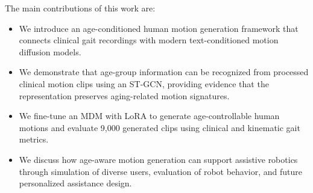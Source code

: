 The main contributions of this work are:
\begin{itemize}
    \item We introduce an age-conditioned human motion generation framework that connects clinical gait recordings with modern text-conditioned motion diffusion models.
    \item We demonstrate that age-group information can be recognized from processed clinical motion clips using an ST-GCN, providing evidence that the representation preserves aging-related motion signatures.
    \item We fine-tune an MDM with LoRA to generate age-controllable human motions and evaluate 9,000 generated clips using clinical and kinematic gait metrics.
    \item We discuss how age-aware motion generation can support assistive robotics through simulation of diverse users, evaluation of robot behavior, and future personalized assistance design.
\end{itemize}